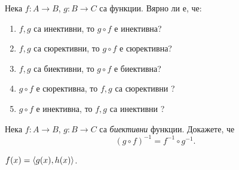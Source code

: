 \begin{prb}
  Нека $f: A\to B$, $g: B\to C$ са функции.
  Вярно ли е, че:
  \begin{enumerate}[1)]
  \item
    $f,g$ са инективни, то $g\circ f$ е инективна?
  \item
    $f,g$ са сюрективни, то $g\circ f$ е сюрективна?
  \item
    $f,g$ са биективни, то $g\circ f$ е биективна?
  \item
    $g\circ f$ е сюрективна,  то $f,g$ са сюрективни ?
  \item
    $g\circ f$ е инективна, то $f,g$ са инективни ?
  \end{enumerate}
\end{prb}

\begin{prb}
  Нека $f: A\to B$, $g: B\to C$ са {\em биективни} функции.
  Докажете, че
  \[(g\circ f)^{-1} = f^{-1}\circ g^{-1}.\]
\end{prb}

\begin{prb}
  $f(x) = \langle{g(x),h(x)}\rangle$.
\end{prb}






